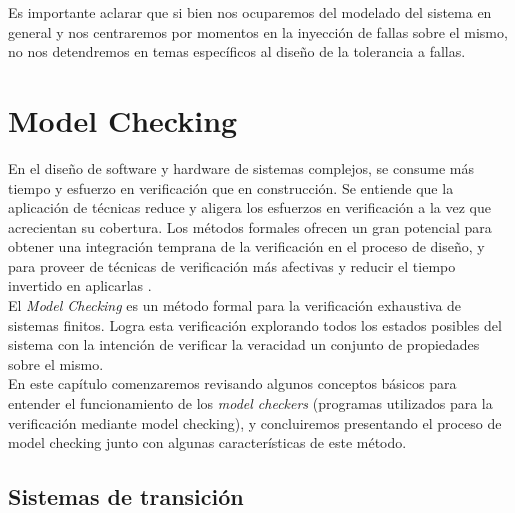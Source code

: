 \documentclass[titlepage, 12pt]{book}
\begin{document}
Es importante aclarar que si bien nos ocuparemos del modelado del sistema en general y nos centraremos por momentos en la inyecci\'on de fallas sobre el mismo, no nos detendremos en temas espec\'ificos al dise\~no de la tolerancia a fallas.











\chapter{Model Checking}

En el dise\~no de software y hardware de sistemas complejos, se consume m\'as tiempo y esfuerzo en verificaci\'on que en construcci\'on. Se entiende que la aplicaci\'on de t\'ecnicas reduce y aligera los esfuerzos en verificaci\'on a la vez que acrecientan su cobertura. Los m\'etodos formales ofrecen un gran potencial para obtener una integraci\'on temprana de la verificaci\'on en el proceso de dise\~no, y para proveer de t\'ecnicas de verificaci\'on m\'as afectivas y reducir el tiempo invertido en aplicarlas \cite{prinMC}.\\

El \textit{Model Checking} es un m\'etodo formal para la verificaci\'on exhaustiva de sistemas finitos. Logra esta verificaci\'on explorando todos los estados posibles del sistema con la intenci\'on de verificar la veracidad un conjunto de propiedades sobre el mismo.\\

En este cap\'itulo comenzaremos revisando algunos conceptos b\'asicos para entender el funcionamiento de los \textit{model checkers} (programas utilizados para la verificaci\'on mediante model checking), y concluiremos presentando el proceso de model checking junto con algunas caracter\'isticas de este m\'etodo.









\section{Sistemas de transici\'on}
\end{document}
